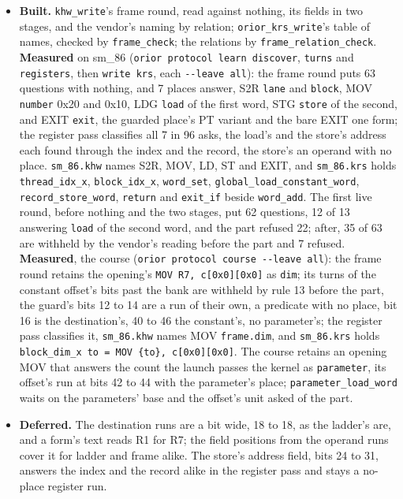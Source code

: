 \begin{itemize}
\item \textbf{Built.} \texttt{khw\_\allowbreak{}write}'s frame round, read against nothing, its fields in two stages, and the vendor's naming by relation; \texttt{orior\_\allowbreak{}krs\_\allowbreak{}write}'s table of names, checked by \texttt{frame\_\allowbreak{}check}; the relations by \texttt{frame\_\allowbreak{}relation\_\allowbreak{}check}. \textbf{Measured} on sm\_\allowbreak{}86 (\texttt{orior protocol learn discover}, \texttt{turns} and \texttt{registers}, then \texttt{write krs}, each \texttt{-\allowbreak{}-\allowbreak{}leave all}): the frame round puts 63 questions with nothing, and 7 places answer, S2R \texttt{lane} and \texttt{block}, MOV \texttt{number} 0x20 and 0x10, LDG \texttt{load} of the first word, STG \texttt{store} of the second, and EXIT \texttt{exit}, the guarded place's PT variant and the bare EXIT one form; the register pass classifies all 7 in 96 asks, the load's and the store's address each found through the index and the record, the store's an operand with no place. \texttt{sm\_\allowbreak{}86.\allowbreak{}khw} names S2R, MOV, LD, ST and EXIT, and \texttt{sm\_\allowbreak{}86.\allowbreak{}krs} holds \texttt{thread\_\allowbreak{}idx\_\allowbreak{}x}, \texttt{block\_\allowbreak{}idx\_\allowbreak{}x}, \texttt{word\_\allowbreak{}set}, \texttt{global\_\allowbreak{}load\_\allowbreak{}constant\_\allowbreak{}word}, \texttt{record\_\allowbreak{}store\_\allowbreak{}word}, \texttt{return} and \texttt{exit\_\allowbreak{}if} beside \texttt{word\_\allowbreak{}add}. The first live round, before nothing and the two stages, put 62 questions, 12 of 13 answering \texttt{load} of the second word, and the part refused 22; after, 35 of 63 are withheld by the vendor's reading before the part and 7 refused. \textbf{Measured}, the course (\texttt{orior protocol course -\allowbreak{}-\allowbreak{}leave all}): the frame round retains the opening's \texttt{MOV R7, c[0x0][0x0]} as \texttt{dim}; its turns of the constant offset's bits past the bank are withheld by rule 13 before the part, the guard's bits 12 to 14 are a run of their own, a predicate with no place, bit 16 is the destination's, 40 to 46 the constant's, no parameter's; the register pass classifies it, \texttt{sm\_\allowbreak{}86.\allowbreak{}khw} names MOV \texttt{frame.\allowbreak{}dim}, and \texttt{sm\_\allowbreak{}86.\allowbreak{}krs} holds \texttt{block\_\allowbreak{}dim\_\allowbreak{}x to = MOV \{to\}, c[0x0][0x0]}. The course retains an opening MOV that answers the count the launch passes the kernel as \texttt{parameter}, its offset's run at bits 42 to 44 with the parameter's place; \texttt{parameter\_\allowbreak{}load\_\allowbreak{}word} waits on the parameters' base and the offset's unit asked of the part.
\item \textbf{Deferred.} The destination runs are a bit wide, 18 to 18, as the ladder's are, and a form's text reads R1 for R7; the field positions from the operand runs cover it for ladder and frame alike. The store's address field, bits 24 to 31, answers the index and the record alike in the register pass and stays a no-place register run.
\end{itemize}

